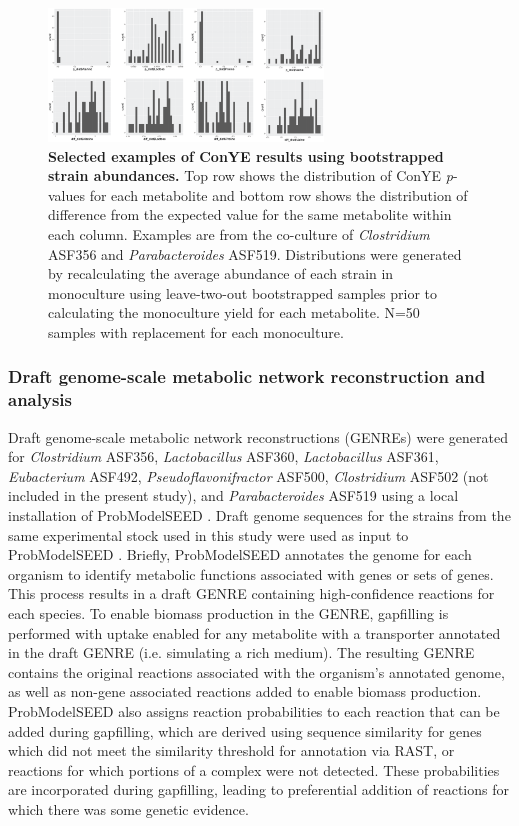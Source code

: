 \documentclass[11pt,twocolumn,notitlepage,openany,twoside]{book}
\begin{document}
\begin{refsection}
\begin{figure}[tb]
\centering
\includegraphics[width=0.65\textwidth]{ch2_figS4}
\caption[Selected examples of ConYE results using bootstrapped strain abundances.]{\textbf{Selected examples of ConYE results using bootstrapped strain abundances.} Top row shows the distribution of ConYE \textit{p}-values for each metabolite and bottom row shows the distribution of difference from the expected value for the same metabolite within each column. Examples are from the co-culture of \textit{Clostridium} ASF356 and \textit{Parabacteroides} ASF519. Distributions were generated by recalculating the average abundance of each strain in monoculture using leave-two-out bootstrapped samples prior to calculating the monoculture yield for each metabolite. N=50 samples with replacement for each monoculture.}
\end{figure}

\subsubsection{Draft genome-scale metabolic network reconstruction and analysis}

Draft genome-scale metabolic network reconstructions (GENREs) were generated for \textit{Clostridium} ASF356, \textit{Lactobacillus} ASF360, \textit{Lactobacillus} ASF361, \textit{Eubacterium} ASF492, \textit{Pseudoflavonifractor} ASF500, \textit{Clostridium} ASF502 (not included in the present study), and \textit{Parabacteroides} ASF519 using a local installation of ProbModelSEED \cite{Benedict2014-yo,Henry2010-um}. Draft genome sequences for the strains from the same experimental stock used in this study were used as input to ProbModelSEED \cite{Wannemuehler2014-cn}. Briefly, ProbModelSEED annotates the genome for each organism to identify metabolic functions associated with genes or sets of genes. This process results in a draft GENRE containing high-confidence reactions for each species. To enable biomass production in the GENRE, gapfilling is performed with uptake enabled for any metabolite with a transporter annotated in the draft GENRE (i.e. simulating a rich medium). The resulting GENRE contains the original reactions associated with the organism’s annotated genome, as well as non-gene associated reactions added to enable biomass production. ProbModelSEED also assigns reaction probabilities to each reaction that can be added during gapfilling, which are derived using sequence similarity for genes which did not meet the similarity threshold for annotation via RAST, or reactions for which portions of a complex were not detected. These probabilities are incorporated during gapfilling, leading to preferential addition of reactions for which there was some genetic evidence.


\end{refsection}
\end{document}
